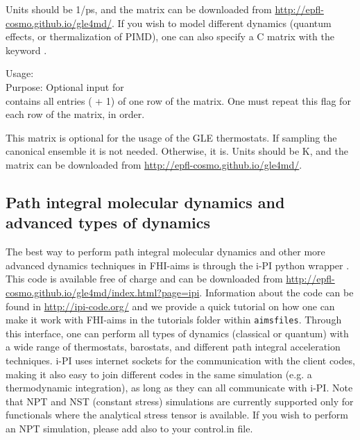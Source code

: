 Units should be 1/ps, and the matrix can be downloaded from \url{http://epfl-cosmo.github.io/gle4md/}.
If you wish to model different dynamics (quantum effects, or thermalization of PIMD), one can also
specify a C matrix with the keyword .

{\noindent
  Usage:   \\[1.0ex]
  Purpose: Optional input for  \\ [1.0ex]
   contains all entries ( + 1) of one row of the matrix. One must repeat this flag for each row of the matrix, in order.   
  \\[1.0em]
}

This matrix is optional for the usage of the GLE thermostats. If sampling the canonical ensemble it is not needed.
Otherwise, it is. Units should be K, and the matrix can be downloaded from \url{http://epfl-cosmo.github.io/gle4md/}.

\subsection{Path integral molecular dynamics and advanced types of dynamics}

The best way to perform path integral molecular dynamics and other more advanced dynamics techniques in FHI-aims is through the i-PI python wrapper \cite{CeriottiMoreMano_2013}.
This code is available free of charge and can be downloaded from \url{http://epfl-cosmo.github.io/gle4md/index.html?page=ipi}. Information about the code can be found
in \url{http://ipi-code.org/} and we provide a quick tutorial on how one can make it work with FHI-aims in the tutorials folder within \texttt{aimsfiles}. Through this
interface, one can perform all types of dynamics (classical or quantum) with a wide range of thermostats, barostats, and different path integral acceleration techniques.
i-PI uses internet sockets for the communication with the client codes, making it also easy to join different codes in the same simulation (e.g. a thermodynamic integration), as long as they
can all communicate with i-PI. 
Note that NPT and NST (constant stress) simulations are currently supported only for functionals where
the analytical stress tensor is available. If you wish to perform an NPT simulation, please add also
  to your control.in file.

